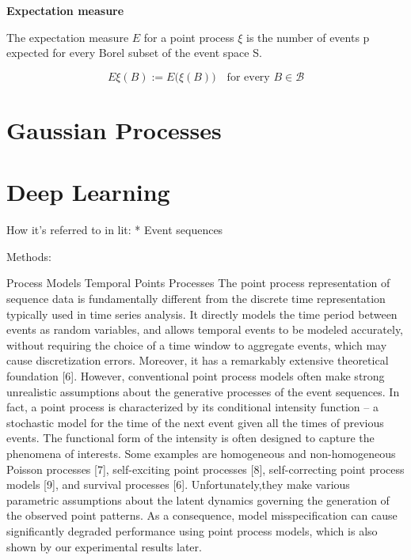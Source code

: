 \par
\textbf{Expectation measure} 

The expectation measure $E$ for a point process $\xi$ is the number of events p expected for every Borel subset of the event space S.

$$E\xi (B):=E{\bigl (}\xi (B){\bigr )}\quad {\text{for every }}B\in {\mathcal  {B}}$$

\section{Gaussian Processes}


\section{Deep Learning}

How it's referred to in lit:
* Event sequences

Methods:

Process Models
Temporal Points Processes
The point process representation of sequence data is
fundamentally different from the discrete time representation typically used in time series analysis. It
directly models the time period between events as random variables, and allows temporal events to
be modeled accurately, without requiring the choice of a time window to aggregate events, which
may cause discretization errors. Moreover, it has a remarkably extensive theoretical foundation [6].
However, conventional point process models often make strong unrealistic assumptions about the
generative processes of the event sequences. In fact, a point process is characterized by its conditional
intensity function – a stochastic model for the time of the next event given all the times of previous
events. The functional form of the intensity is often designed to capture the phenomena of interests.
Some examples are homogeneous and non-homogeneous Poisson processes [7], self-exciting point
processes [8], self-correcting point process models [9], and survival processes [6]. Unfortunately,they make various parametric assumptions about the latent dynamics governing the generation of the
observed point patterns. As a consequence, model misspecification can cause significantly degraded
performance using point process models, which is also shown by our experimental results later.

